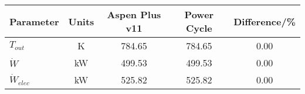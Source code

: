 \begin{tabular}{|p{2.5cm} c c c c|}
    \hline
    \rowcolor{bluepoli!40} %
    \textbf{Parameter} & \textbf{Units} & \textbf{Aspen Plus v11} & \textbf{Power Cycle} & \textbf{Difference/\unit{\percent}} \T\B \\
    \hline \hline
    \(T_{out}\) & \unit{\K} & 784.65 & 784.65 & 0.00 \T\B\\
    \(\Dot{W}\) & \unit{\kilo\watt} & 499.53 & 499.53 & 0.00 \T\B\\
    \(\Dot{W}_{elec}\) & \unit{\kilo\watt} & 525.82 & 525.82 & 0.00 \T\B\\
    \hline
\end{tabular}